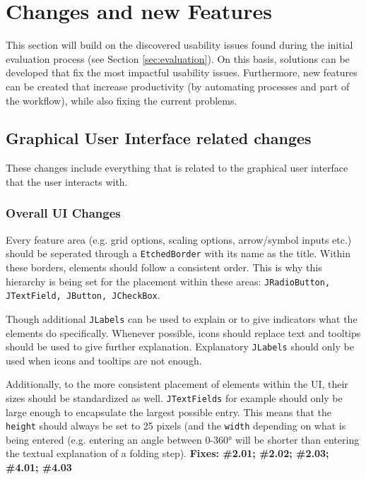 
\section{Changes and new Features}
\label{sec:solutions}

This section will build on the discovered usability issues found during the initial evaluation process (see Section \ref{sec:evaluation}). On this basis, solutions can be developed that fix the most impactful usability issues. Furthermore, new features can be created that increase productivity (by automating processes and part of the workflow), while also fixing the current problems.


\subsection{Graphical User Interface related changes}

These changes include everything that is related to the graphical user interface that the user interacts with.

\subsubsection{Overall UI Changes}
Every feature area (e.g. grid options, scaling options, arrow/symbol inputs etc.) should be seperated through a \texttt{EtchedBorder} with its name as the title. Within these borders, elements should follow a consistent order. This is why this hierarchy is being set for the placement within these areas: \texttt{JRadioButton, JTextField, JButton, JCheckBox}.

Though additional \texttt{JLabels} can be used to explain or to give indicators what the elements do specifically. Whenever possible, icons should replace text and tooltips should be used to give further explanation. Explanatory \texttt{JLabels} should only be used when icons and tooltips are not enough.

Additionally, to the more consistent placement of elements within the UI, their sizes should be standardized as well. \texttt{JTextFields} for example should only be large enough to encapsulate the largest possible entry. This means that the \texttt{height} should always be set to 25 pixels (and the \texttt{width} depending on what is being entered (e.g. entering an angle between 0-360° will be shorter than entering the textual explanation of a folding step).
\newline
\textbf{Fixes: \#2.01; \#2.02; \#2.03; \#4.01; \#4.03}\\

